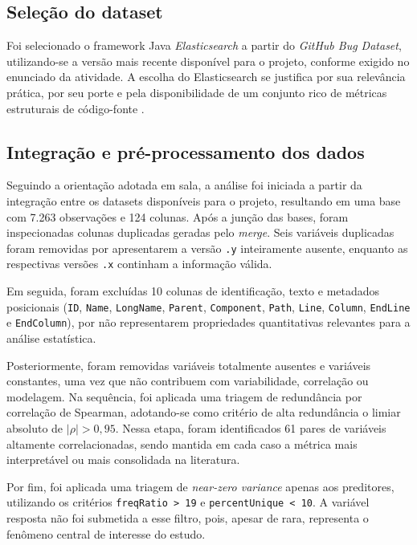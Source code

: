 \documentclass[12pt]{article}
\begin{document}
\subsection{Seleção do dataset}

Foi selecionado o framework Java \textit{Elasticsearch} a partir do \textit{GitHub Bug Dataset}, utilizando-se a versão mais recente disponível para o projeto, conforme exigido no enunciado da atividade. A escolha do Elasticsearch se justifica por sua relevância prática, por seu porte e pela disponibilidade de um conjunto rico de métricas estruturais de código-fonte \cite{githubbugdataset,elastic}.

\subsection{Integração e pré-processamento dos dados}

Seguindo a orientação adotada em sala, a análise foi iniciada a partir da integração entre os datasets disponíveis para o projeto, resultando em uma base com 7.263 observações e 124 colunas. Após a junção das bases, foram inspecionadas colunas duplicadas geradas pelo \textit{merge}. Seis variáveis duplicadas foram removidas por apresentarem a versão \texttt{.y} inteiramente ausente, enquanto as respectivas versões \texttt{.x} continham a informação válida.

Em seguida, foram excluídas 10 colunas de identificação, texto e metadados posicionais (\texttt{ID}, \texttt{Name}, \texttt{LongName}, \texttt{Parent}, \texttt{Component}, \texttt{Path}, \texttt{Line}, \texttt{Column}, \texttt{EndLine} e \texttt{EndColumn}), por não representarem propriedades quantitativas relevantes para a análise estatística.

Posteriormente, foram removidas variáveis totalmente ausentes e variáveis constantes, uma vez que não contribuem com variabilidade, correlação ou modelagem. Na sequência, foi aplicada uma triagem de redundância por correlação de Spearman, adotando-se como critério de alta redundância o limiar absoluto de \(|\rho| > 0{,}95\). Nessa etapa, foram identificados 61 pares de variáveis altamente correlacionadas, sendo mantida em cada caso a métrica mais interpretável ou mais consolidada na literatura.

Por fim, foi aplicada uma triagem de \textit{near-zero variance} apenas aos preditores, utilizando os critérios \texttt{freqRatio > 19} e \texttt{percentUnique < 10}. A variável resposta não foi submetida a esse filtro, pois, apesar de rara, representa o fenômeno central de interesse do estudo.
\end{document}
